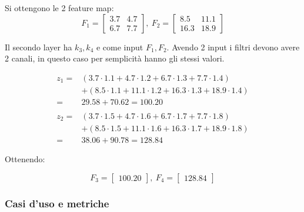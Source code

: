 \documentclass{article}
\begin{document}
Si ottengono le 2 feature map:
$$F_1=
\begin{bmatrix}
3.7 & 4.7\\
6.7 & 7.7
\end{bmatrix},\
F_2=
\begin{bmatrix}
8.5 & 11.1\\
16.3 & 18.9
\end{bmatrix}
$$\newline

Il secondo layer ha $k_3,k_4$ e come input $F_1,F_2$. Avendo 2 input i filtri devono avere 2 canali, in questo caso per semplicità hanno gli stessi valori.

\[
\begin{aligned}
z_1={}&
(3.7\cdot1.1+4.7\cdot1.2+6.7\cdot1.3+7.7\cdot1.4)\\
&+
(8.5\cdot1.1+11.1\cdot1.2+16.3\cdot1.3+18.9\cdot1.4)\\
={}&29.58+70.62=100.20\\
\\
z_2={}&
(3.7\cdot1.5+4.7\cdot1.6+6.7\cdot1.7+7.7\cdot1.8)\\
&+
(8.5\cdot1.5+11.1\cdot1.6+16.3\cdot1.7+18.9\cdot1.8)\\
={}&38.06+90.78=128.84
\end{aligned}
\]\newline

Ottenendo:

\[
F_3=
\begin{bmatrix}
100.20
\end{bmatrix}
,\
F_4=\begin{bmatrix}
    128.84
\end{bmatrix}
\]

\subsubsection{Casi d'uso e metriche}
\end{document}
